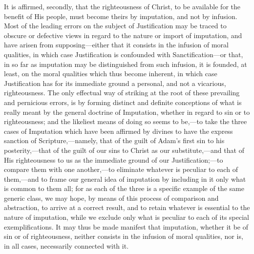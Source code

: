 \documentclass[
]{book}
\begin{document}
It is affirmed, secondly, that the righteousness of Christ, to be available for the benefit of His people, must become theirs by imputation, and not by infusion. Most of the leading errors on the subject of Justification may be traced to obscure or defective views in regard to the nature or import of imputation, and have arisen from supposing---either that it consists in the infusion of moral qualities, in which case Justification is confounded with Sanctification---or that, in so far as imputation may be distinguished from such infusion, it is founded, at least, on the moral qualities which thus become inherent, in which case Justification has for its immediate ground a personal, and not a vicarious, righteousness. The only effectual way of striking at the root of these prevailing and pernicious errors, is by forming distinct and definite conceptions of what is really meant by the general doctrine of Imputation, whether in regard to sin or to righteousness; and the likeliest means of doing so seems to be,---to take the three cases of Imputation which have been affirmed by divines to have the express sanction of Scripture,---namely, that of the guilt of Adam's first sin to his posterity,---that of the guilt of our sins to Christ as our substitute,---and that of His righteousness to us as the immediate ground of our Justification;---to compare them with one another,---to eliminate whatever is peculiar to each of them,---and to frame our general idea of imputation by including in it only what is common to them all; for as each of the three is a specific example of the same generic class, we may hope, by means of this process of comparison and abstraction, to arrive at a correct result, and to retain whatever is essential to the nature of imputation, while we exclude only what is peculiar to each of its special exemplifications. It may thus be made manifest that imputation, whether it be of sin or of righteousness, neither consists in the infusion of moral qualities, nor is, in all cases, necessarily connected with it.
\end{document}
